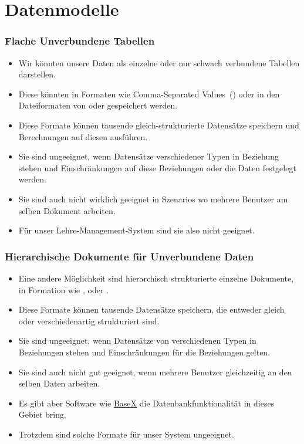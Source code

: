\documentclass[aspectratio=169,mathserif,notheorems]{beamer}%
\begin{document}
\section{Datenmodelle}%
%
\begin{frame}%
\frametitle{Flache Unverbundene Tabellen}%
\begin{itemize}%
\item Wir könnten unsere Daten als einzelne oder nur schwach verbundene Tabellen darstellen.%
%
\item<2-> Diese könnten in Formaten wie Comma-Separated Values~()\cite{RFC4180} oder in den Dateiformaten von \microsoftExcel\cite{B2023DMWME,G2024ECRFMME,LF2022MOSBSO2AM3} oder \libreofficeCalc\cite{S2022L7PFEUU,DF2024LTDF} gespeichert werden.%
%
\item<3-> Diese Formate können tausende gleich-strukturierte Datensätze speichern und Berechnungen auf diesen ausführen.%
%
\item<4-> Sie sind ungeeignet, wenn Datensätze verschiedener Typen in Beziehung stehen und Einschränkungen auf diese Beziehungen oder die Daten festgelegt werden.%
%
\item<5-> Sie sind auch nicht wirklich geeignet in Szenarios wo mehrere Benutzer am selben Dokument arbeiten.%
%
\item<6-> Für unser Lehre-Management-System sind sie also nicht geeignet.%
\end{itemize}%
\end{frame}%
%
\begin{frame}%
\frametitle{Hierarchische Dokumente für Unverbundene Daten}%
\begin{itemize}%
\item Eine andere Möglichkeit sind hierarchisch strukturierte einzelne Dokumente, in Formation wie \cite{BPSMM2008EMLX1FE,K2019ITXJY,CH2013XFCAMLTMC}, \cite{E2017SE4TJDIS,RFC8259} oder \cite{DNMAASBE2021YAMLYV1,K2019ITXJY,CGTYB2022YFFDCAIE}.%
%
\item<2-> Diese Formate können tausende Datensätze speichern, die entweder gleich oder verschiedenartig strukturiert sind.%
%
\item<3-> Sie sind ungeeignet, wenn Datensätze von verschiedenen Typen in Beziehungen stehen und Einschränkungen für die Beziehungen gelten.%
%
\item<4-> Sie sind auch nicht gut geeignet, wenn mehrere Benutzer gleichzeitig an den selben Daten arbeiten.%
%
\item<5-> Es gibt aber  Software wie \href{https://basex.org}{BaseX}\cite{GHS2010B,G2006PXMMDTTL} die Datenbankfunktionalität in dieses Gebiet bring.%
%
\item<6-> Trotzdem sind solche Formate für unser System ungeeignet.%
\end{itemize}%
\end{frame}%
\end{document}
